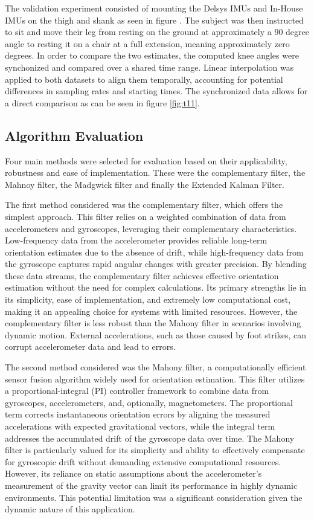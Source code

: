 The validation experiment consisted of mounting the Delsys IMUs and In-House IMUs on the thigh and shank as seen in figure . The subject was then instructed to sit and move their leg from resting on the ground at approximately a 90 degree angle to resting it on a chair at a full extension, meaning approximately zero degrees. In order to compare the two estimates, the computed knee angles were synchonized and compared over a shared time range. Linear interpolation was applied to both datasets to align them temporally, accounting for potential differences in sampling rates and starting times. The synchronized data allows for a direct comparison as can be seen in figure \ref{fig:t11}. 

\subsection{Algorithm Evaluation}
Four main methods were selected for evaluation based on their applicability, robustness and ease of implementation. These were the complementary filter, the Mahnoy filter, the Madgwick filter and finally the Extended Kalman Filter.

The first method considered was the complementary filter, which offers the simplest approach. This filter relies on a weighted combination of data from accelerometers and gyroscopes, leveraging their complementary characteristics. Low-frequency data from the accelerometer provides reliable long-term orientation estimates due to the absence of drift, while high-frequency data from the gyroscope captures rapid angular changes with greater precision. By blending these data streams, the complementary filter achieves effective orientation estimation without the need for complex calculations. Its primary strengths lie in its simplicity, ease of implementation, and extremely low computational cost, making it an appealing choice for systems with limited resources. However, the complementary filter is less robust than the Mahony filter in scenarios involving dynamic motion. External accelerations, such as those caused by foot strikes, can corrupt accelerometer data and lead to errors. 

The second method considered was the Mahony filter, a computationally efficient sensor fusion algorithm widely used for orientation estimation. This filter utilizes a proportional-integral (PI) controller framework to combine data from gyroscopes, accelerometers, and, optionally, magnetometers. The proportional term corrects instantaneous orientation errors by aligning the measured accelerations with expected gravitational vectors, while the integral term addresses the accumulated drift of the gyroscope data over time. The Mahony filter is particularly valued for its simplicity and ability to effectively compensate for gyroscopic drift without demanding extensive computational resources. However, its reliance on static assumptions about the accelerometer’s measurement of the gravity vector can limit its performance in highly dynamic environments. This potential limitation was a significant consideration given the dynamic nature of this application. 

